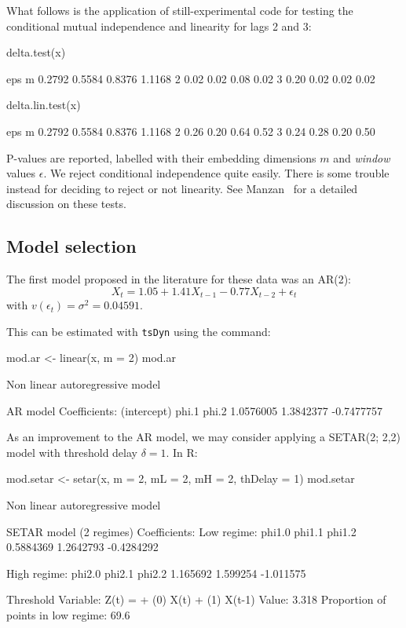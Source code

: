 \documentclass[a4paper]{article}
\newcommand{\tsDyn}{\texttt{tsDyn} }
\begin{document}
What follows is the application of still-experimental code for testing the conditional mutual independence and linearity for lags 2 and 3:
\begin{Schunk}
\begin{Sinput}
 delta.test(x)
\end{Sinput}
\begin{Soutput}
   eps
m   0.2792 0.5584 0.8376 1.1168
  2   0.02   0.02   0.08   0.02
  3   0.20   0.02   0.02   0.02
\end{Soutput}
\begin{Sinput}
 delta.lin.test(x)
\end{Sinput}
\begin{Soutput}
   eps
m   0.2792 0.5584 0.8376 1.1168
  2   0.26   0.20   0.64   0.52
  3   0.24   0.28   0.20   0.50
\end{Soutput}
\end{Schunk}
P-values are reported, labelled with their embedding dimensions $m$
and \emph{window} values $\epsilon$.
We reject conditional independence quite easily. There is some trouble instead for deciding to reject or not linearity. See Manzan~\cite{Manzan2003} for a detailed discussion on these tests.

\subsection{Model selection}
The first model proposed in the literature for these data was an AR(2): 
\[
X_t = 1.05 + 1.41 X_{t-1} - 0.77 X_{t-2} + \epsilon_t
\]
with $v(\epsilon_t)=\sigma^2=0.04591$.

This can be estimated with \tsDyn using the command:
\begin{Schunk}
\begin{Sinput}
 mod.ar <- linear(x, m = 2)
 mod.ar
\end{Sinput}
\begin{Soutput}
Non linear autoregressive model

AR model
Coefficients:
(intercept)       phi.1       phi.2 
  1.0576005   1.3842377  -0.7477757 
\end{Soutput}
\end{Schunk}

As an improvement to the AR model, we may consider applying a SETAR(2; 2,2) model with threshold delay $\delta=1$. In R:
\begin{Schunk}
\begin{Sinput}
 mod.setar <- setar(x, m = 2, mL = 2, mH = 2, thDelay = 1)
 mod.setar
\end{Sinput}
\begin{Soutput}
Non linear autoregressive model

SETAR model (2 regimes)
Coefficients:
Low regime:
    phi1.0     phi1.1     phi1.2 
 0.5884369  1.2642793 -0.4284292 

High regime:
   phi2.0    phi2.1    phi2.2 
 1.165692  1.599254 -1.011575 

Threshold
Variable: Z(t) = + (0) X(t) + (1) X(t-1)
Value: 3.318
Proportion of points in low regime: 69.6%
\end{Soutput}
\end{Schunk}
\end{document}
